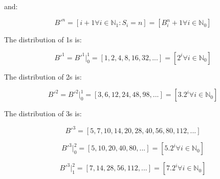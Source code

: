 \documentclass{article}
\begin{document}
\noindent
and:

\begin{displaymath}
B'^n
= [i+1 \forall i \in \mathbb{N}_{1} : S_i = n]
= [B^n_i + 1 \forall i \in \mathbb{N}_{0}]
\end{displaymath}

\noindent
The distribution of 1s is:

\begin{displaymath}
B'^1
= B'^1|^1_0
= [1, 2, 4, 8, 16, 32, ...]
= [2^i \forall i \in \mathbb{N}_{0}]
\end{displaymath}

\noindent
The distribution of 2s is:

\begin{displaymath}
B'^2
= B'^2|^1_0
= [3, 6, 12, 24, 48, 98, ...]
= [3.2^i \forall i \in \mathbb{N}_{0}]
\end{displaymath}

\noindent
The distribution of 3s is:

\begin{displaymath}
B'^3
= [5, 7, 10, 14, 20, 28, 40, 56, 80, 112, ...]
\end{displaymath}

\begin{displaymath}
B'^3|^2_0
= [5, 10, 20, 40, 80, ...]
= [5.2^i \forall i \in \mathbb{N}_{0}]
\end{displaymath}

\begin{displaymath}
B'^3|^2_1
= [7, 14, 28, 56, 112, ...]
= [7.2^i \forall i \in \mathbb{N}_{0}]
\end{displaymath}
\end{document}
